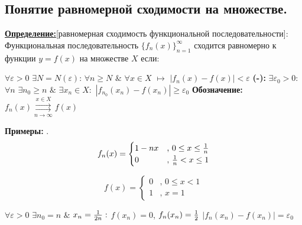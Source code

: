 \documentclass[a4paper,12pt]{article} %
\begin{document}
\subsection{Понятие равномерной сходимости на множестве.}

\underline{\textbf{Определение:}}[равномерная сходимость функциональной последовательности]:\newline
Функциональная последовательность $\{f_n(x)\}_{n=1}^\infty$ сходится равномерно к функции $y=f(x)$ на множестве $X$ если: \newline \newline

$\forall \varepsilon > 0 $  $\exists N = N(\varepsilon)$: $\forall n \geq N$  $\&$  $\forall x \in X$ $\longmapsto$ $|f_n(x) -f(x)| < \varepsilon$
\newline \newline
\hspace*{5mm} \noindent \textbf{(-):} $\exists \varepsilon_0>0:$ $\forall n$  $\exists n_0 \geq n$  $\&$  $\exists x_n \in X:$ $|f_{n_0}(x_n)-f(x_n)| \geq \varepsilon_0$ 
\newline \newline
\noindent \textbf{Обозначение:} $f_n(x) \overset{x \in X}{\underset{n \rightarrow \infty}{\rightrightarrows}} f(x)$

\noindent \textbf{Примеры:} .
\begin{equation*}
f_n(x) = 
 \begin{cases}
   1-nx &\text{, $0 \leq x \leq {1 \over n}$}\\
   0 &\text{, ${1\over n}< x\leq 1$}
 \end{cases}
\end{equation*}

\begin{equation*}
f(x) = 
 \begin{cases}
   0 &\text{, $0 \leq x < {1}$}\\
   1 &\text{, $x=1$}
 \end{cases}
\end{equation*}



$\forall \varepsilon > 0$  $\exists n_0 = n$ $\&$ $x_n = {1\over 2n}:$ \newline
\hspace*{40 mm}$f(x_n) = 0$, $f_n(x_n) = {1\over2}$ \newline
\hspace*{40 mm}$|f_n(x_n) - f(x_n)| = \varepsilon_0$
\end{document}

